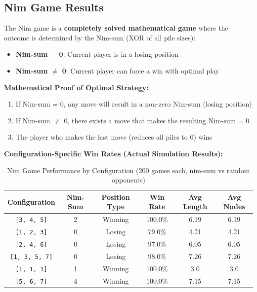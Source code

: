 \documentclass[12pt]{article}
\begin{document}
\subsection{Nim Game Results}

The Nim game is a \textbf{completely solved mathematical game} where the outcome is determined by the Nim-sum (XOR of all pile sizes):

\begin{itemize}
    \item \textbf{Nim-sum = 0}: Current player is in a losing position
    \item \textbf{Nim-sum $\neq$ 0}: Current player can force a win with optimal play
\end{itemize}

\textbf{Mathematical Proof of Optimal Strategy:}
\begin{enumerate}
    \item If Nim-sum = 0, any move will result in a non-zero Nim-sum (losing position)
    \item If Nim-sum $\neq$ 0, there exists a move that makes the resulting Nim-sum = 0
    \item The player who makes the last move (reduces all piles to 0) wins
\end{enumerate}

\textbf{Configuration-Specific Win Rates (Actual Simulation Results):}

\begin{table}[h]
\centering
\begin{tabular}{|c|c|c|c|c|c|}
\hline
\textbf{Configuration} & \textbf{Nim-Sum} & \textbf{Position Type} & \textbf{Win Rate} & \textbf{Avg Length} & \textbf{Avg Nodes} \\
\hline
\texttt{[3, 4, 5]} & 2 & Winning & 100.0\% & 6.19 & 6.19 \\
\texttt{[1, 2, 3]} & 0 & Losing & 79.0\% & 4.21 & 4.21 \\
\texttt{[2, 4, 6]} & 0 & Losing & 97.0\% & 6.05 & 6.05 \\
\texttt{[1, 3, 5, 7]} & 0 & Losing & 98.0\% & 7.26 & 7.26 \\
\texttt{[1, 1, 1]} & 1 & Winning & 100.0\% & 3.0 & 3.0 \\
\texttt{[5, 6, 7]} & 4 & Winning & 100.0\% & 7.15 & 7.15 \\
\hline
\end{tabular}
\caption{Nim Game Performance by Configuration (200 games each, nim-sum vs random opponents)}
\end{table}
\end{document}
